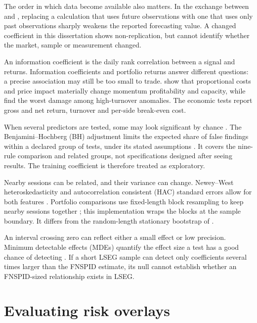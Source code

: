 The order in which data become available also matters. In the exchange between
\citet{farmer2023} and \citet{cakici2025}, replacing a calculation that uses
future observations with one that uses only past observations sharply weakens
the reported forecasting value. A changed coefficient in this dissertation
shows non-replication, but cannot identify whether the market, sample or
measurement changed.

An information coefficient is the daily rank correlation between a signal and
returns. Information coefficients and portfolio returns answer different
questions: a precise association may still be too small to trade.
\citet{korajczyk2004} show that proportional costs and price impact materially
change momentum profitability and capacity, while \citet{novymarx2016} find the
worst damage among high-turnover anomalies. The economic tests report gross and
net return, turnover and per-side break-even cost.

When several predictors are tested, some may look significant by chance
\citep{harvey2016multiple}. The Benjamini--Hochberg (BH) adjustment limits the
expected share of false findings within a declared group of tests, under its
stated assumptions \citep{benjamini1995}. It covers the nine-rule comparison and
related groups, not specifications designed after seeing results. The training
coefficient is therefore treated as exploratory.

Nearby sessions can be related, and their variance can change. Newey--West
heteroskedasticity and autocorrelation consistent (HAC) standard errors allow
for both features
\citep{newey1987}. Portfolio comparisons use fixed-length block resampling to
keep nearby sessions together \citep{kunsch1989}; this implementation wraps the
blocks at the sample boundary. It differs from the random-length stationary
bootstrap of \citet{politis1994}.

An interval crossing zero can reflect either a small effect or low precision.
Minimum detectable effects (MDEs) quantify the effect size a test has a good
chance of detecting \citep{bloom1995}. If a short LSEG sample can detect only
coefficients several times larger than the FNSPID estimate, its null cannot
establish whether an FNSPID-sized relationship exists in LSEG\@.

\section{Evaluating risk overlays}

